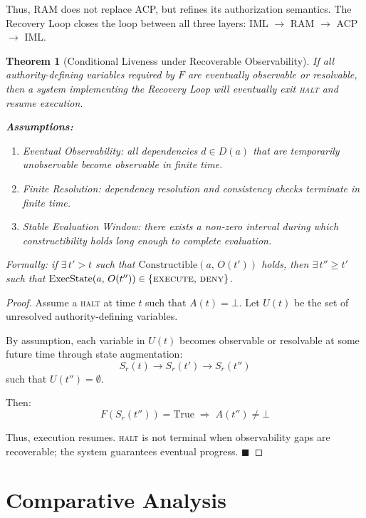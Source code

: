 \documentclass[11pt]{article}
\newtheorem{theorem}{Theorem}
\begin{document}
Thus, RAM does not replace ACP, but refines its authorization semantics. The Recovery Loop
closes the loop between all three layers: IML $\rightarrow$ RAM $\rightarrow$ ACP
$\rightarrow$ IML.

\begin{theorem}[Conditional Liveness under Recoverable Observability]
\label{thm:liveness}
If all authority-defining variables required by $F$ are eventually observable or
resolvable, then a system implementing the Recovery Loop will eventually exit
\textsc{halt} and resume execution.

\noindent\textbf{Assumptions:}
\begin{enumerate}
  \item \textit{Eventual Observability}: all dependencies $d \in D(a)$ that are
        temporarily unobservable become observable in finite time.
  \item \textit{Finite Resolution}: dependency resolution and consistency checks
        terminate in finite time.
  \item \textit{Stable Evaluation Window}: there exists a non-zero interval during
        which constructibility holds long enough to complete evaluation.
\end{enumerate}

Formally: if $\exists\, t' > t$ such that $\mathrm{Constructible}(a,\,O(t'))$ holds,
then $\exists\, t'' \geq t'$ such that
$\mathrm{ExecState}(a,\,O(t'')) \in \{\textsc{execute},\,\textsc{deny}\}$.
\end{theorem}

\begin{proof}
Assume a \textsc{halt} at time $t$ such that $A(t) = \bot$.
Let $U(t)$ be the set of unresolved authority-defining variables.

By assumption, each variable in $U(t)$ becomes observable or resolvable at some future
time through state augmentation:
\[
  S_r(t) \rightarrow S_r(t') \rightarrow S_r(t'')
\]
such that $U(t'') = \emptyset$.

Then:
\[
  F(S_r(t'')) = \text{True} \;\Rightarrow\; A(t'') \neq \bot
\]

Thus, execution resumes. \textsc{halt} is not terminal when observability gaps are
recoverable; the system guarantees eventual progress. \hfill $\blacksquare$
\end{proof}

\section{Comparative Analysis}
\end{document}
